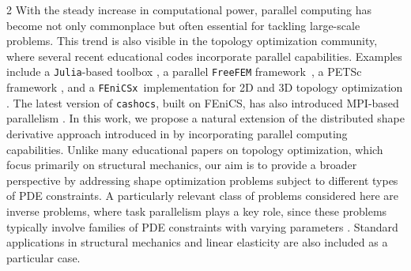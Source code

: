 \documentclass[a4paper, oneside]{article}
\newcommand{\fx}{\texttt{FEniCSx}}
\begin{document}
\begin{multicols}{2}
With the steady increase in computational power, parallel computing has become not only commonplace but often essential for tackling large-scale problems. 
This trend is also visible in the topology optimization community, where several recent educational codes incorporate parallel capabilities. 
Examples include a \texttt{Julia}-based toolbox \cite{Wegert2025}, a parallel \texttt{FreeFEM} framework~\cite{MR4916810}, a PETSc  framework \cite{Aage2014}, and a \fx\ implementation for 2D and 3D topology optimization \cite{Jia2024}. The latest version of \texttt{cashocs}, built on FEniCS, has also introduced MPI-based parallelism \cite{BLAUTH2021100646,BLAUTH2023101577}.
In this work, we propose a natural extension of the distributed shape derivative approach introduced in \cite{MR3843884} by incorporating parallel computing capabilities.
Unlike many educational papers on topology optimization, which focus primarily on structural mechanics, our aim is to provide a broader perspective by addressing shape optimization problems subject to different types of PDE constraints.
A particularly relevant class of problems considered here are inverse problems, where task parallelism plays a key role, since these problems typically involve families of PDE constraints with varying parameters \cite{MR4261115}. Standard applications in  structural mechanics and linear elasticity are also included as a particular case.




\end{multicols}
\end{document}
